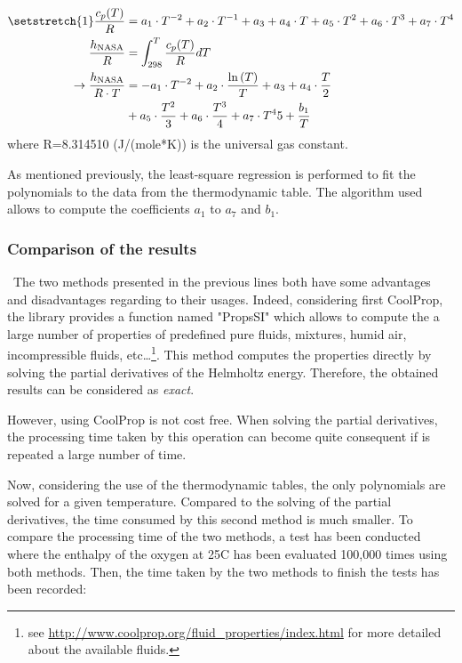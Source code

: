 \begin{align}
\setstretch{1}
   \frac{c_p(T)}{R} &=  a_1\cdot T^{-2} + a_2\cdot T^{-1} + a_3 + a_4\cdot T
 + a_5\cdot T^2 + a_6\cdot T^3 + a_7\cdot T^4\label{eq:C7_NASACP}\\
    \frac{h_\text{NASA}}{R} &= \int_{298}^T\frac{c_p(T)}{R}dT\nonumber\\
    \rightarrow \frac{h_\text{NASA}}{R\cdot T} &=-a_1\cdot T^{-2} + a_2\cdot \frac{\ln{(T)}}{T} + a_3 + a_4\cdot \frac{T}{2}\nonumber\\
    &+ a_5\cdot \frac{T^2}{3}
         + a_6\cdot \frac{T^3}{4} + a_7\cdot {T^4}{5} + \frac{b_1}{T}\label{eq:C7_NASAH}
\end{align}
where R=8.314510 (J/(mole*K)) is the universal gas constant. 

As mentioned previously, the least-square regression is performed to fit the polynomials to the data from the thermodynamic table. The algorithm used allows to compute the coefficients $a_1$ to $a_7$ and $b_1$. 

\subsubsection{Comparison of the results}
\quad\ The two methods presented in the previous lines both have some advantages and disadvantages regarding to their usages. Indeed, considering first CoolProp, the library provides a function named "PropsSI" which allows to compute the a large number of properties of predefined pure fluids, mixtures, humid air, incompressible fluids, etc\dots \footnote{see \url{http://www.coolprop.org/fluid_properties/index.html} for more detailed about the available fluids.}. This method computes the properties directly by solving the partial derivatives of the Helmholtz energy. Therefore, the obtained results can be considered as \textit{exact}.

However, using CoolProp is not cost free. When solving the partial derivatives, the processing time taken by this operation can become quite consequent if is repeated a large number of time.

Now, considering the use of the thermodynamic tables, the only polynomials are solved for a given temperature. Compared to the solving of the partial derivatives, the time consumed by this second method is much smaller. To compare the processing time of the two methods, a test has been conducted where the enthalpy of the oxygen at 25\degree C has been evaluated 100,000 times using both methods. Then, the time taken by the two methods to finish the tests has been recorded:

